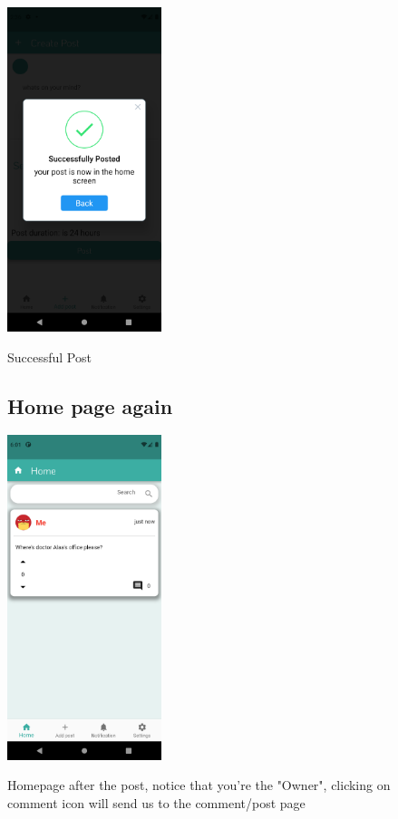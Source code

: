 \documentclass[12pt]{article}
\begin{document}
\begin{figure}[h!]

{\includegraphics[width=0.4\textwidth]{./Screenshots/12.PNG}}
  \caption{Successful Post}
  \end{figure}
  \begin{figure}[h!]
  \subsection*{Home page again}
{\includegraphics[width=0.4\textwidth]{./Screenshots/13.PNG}}
  \caption{Homepage after the post, notice that you're the "Owner", clicking on comment icon will send us to the comment/post page}
  \end{figure}
\end{document}
